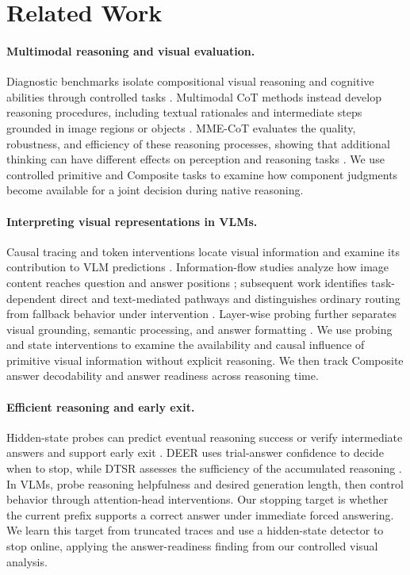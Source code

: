 \documentclass{article} %
\begin{document}
\section{Related Work}

\paragraph{Multimodal reasoning and visual evaluation.}
Diagnostic benchmarks isolate compositional visual reasoning and cognitive abilities through controlled tasks \citep{johnson2017clevr,schiappa2024probing,huang2025visfactor}. Multimodal CoT methods instead develop reasoning procedures, including textual rationales and intermediate steps grounded in image regions or objects \citep{zhang2024multimodalcot,shao2024visualcot,li2025vocot}. MME-CoT evaluates the quality, robustness, and efficiency of these reasoning processes, showing that additional thinking can have different effects on perception and reasoning tasks \citep{jiang2025mmecot}. We use controlled primitive and Composite tasks to examine how component judgments become available for a joint decision during native reasoning.

\paragraph{Interpreting visual representations in VLMs.}
Causal tracing and token interventions locate visual information and examine its contribution to VLM predictions \citep{basu2024understanding,neo2025interpreting}. Information-flow studies analyze how image content reaches question and answer positions \citep{zhang2025crossmodal}; subsequent work identifies task-dependent direct and text-mediated pathways and distinguishes ordinary routing from fallback behavior under intervention \citep{salazar2026pathways}. Layer-wise probing further separates visual grounding, semantic processing, and answer formatting \citep{yu2025multimodal}. We use probing and state interventions to examine the availability and causal influence of primitive visual information without explicit reasoning. We then track Composite answer decodability and answer readiness across reasoning time.

\paragraph{Efficient reasoning and early exit.}
Hidden-state probes can predict eventual reasoning success \citep{afzal2025knowing} or verify intermediate answers and support early exit \citep{zhang2025reasoningmodels}. DEER uses trial-answer confidence to decide when to stop, while DTSR assesses the sufficiency of the accumulated reasoning \citep{yang2026deer,xiang2026thinking}. In VLMs, \citet{bi2026seeing} probe reasoning helpfulness and desired generation length, then control behavior through attention-head interventions. Our stopping target is whether the current prefix supports a correct answer under immediate forced answering. We learn this target from truncated traces and use a hidden-state detector to stop online, applying the answer-readiness finding from our controlled visual analysis.
\end{document}
